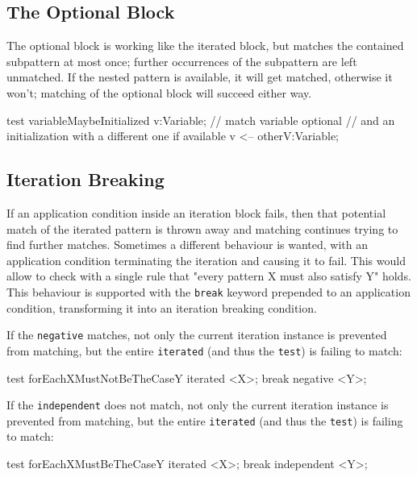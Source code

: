 \subsection*{The Optional Block}
The optional block is working like the iterated block, but matches the contained subpattern at most once; further occurrences of the subpattern are left unmatched.
If the nested pattern is available, it will get matched, otherwise it won't; matching of the optional block will succeed either way.

\begin{example}
  \begin{grgen}
test variableMaybeInitialized
{
  v:Variable; // match variable
  optional { // and an initialization with a different one if available
    v <-- otherV:Variable;
  }
}
  \end{grgen}
\end{example}

\subsection*{Iteration Breaking} 
If an application condition inside an iteration block fails, then that potential match of the iterated pattern is thrown away and matching continues trying to find further matches.
Sometimes a different behaviour is wanted, with an application condition terminating the iteration and causing it to fail.
This would allow to check with a single rule that "every pattern X must also satisfy Y" holds.
This behaviour is supported with the \texttt{break} keyword prepended to an application condition, transforming it into an iteration breaking condition.

\begin{example}
If the \texttt{negative} matches, not only the current iteration instance is prevented from matching, but the entire \texttt{iterated} (and thus the \texttt{test}) is failing to match:
  \begin{grgen}
test forEachXMustNotBeTheCaseY
{
  iterated {
    <X>;
    break negative { 
      <Y>;
    }
  }
}
  \end{grgen}

If the \texttt{independent} does not match, not only the current iteration instance is prevented from matching, but the entire \texttt{iterated} (and thus the \texttt{test}) is failing to match:
  \begin{grgen}
test forEachXMustBeTheCaseY
{
  iterated {
    <X>;
    break independent { 
      <Y>;
    }
  }
}
  \end{grgen}
\end{example}


